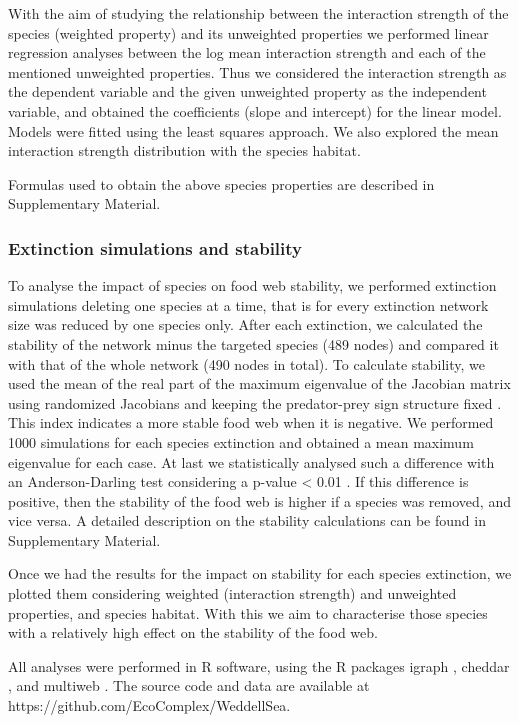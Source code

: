 \documentclass[gc, manuscript]{copernicus}
\begin{document}
With the aim of studying the relationship between the interaction
strength of the species (weighted property) and its unweighted
properties we performed linear regression analyses between the log mean
interaction strength and each of the mentioned unweighted properties.
Thus we considered the interaction strength as the dependent variable
and the given unweighted property as the independent variable, and
obtained the coefficients (slope and intercept) for the linear model.
Models were fitted using the least squares approach. We also explored
the mean interaction strength distribution with the species habitat.

Formulas used to obtain the above species properties are described in
Supplementary Material.

\subsubsection{Extinction simulations and stability}

To analyse the impact of species on food web stability, we performed
extinction simulations deleting one species at a time, that is for every
extinction network size was reduced by one species only. After each
extinction, we calculated the stability of the network minus the
targeted species (489 nodes) and compared it with that of the whole
network (490 nodes in total). To calculate stability, we used the mean
of the real part of the maximum eigenvalue of the Jacobian matrix using
randomized Jacobians and keeping the predator-prey sign structure fixed
\citep{Allesina2008, Grilli2016}. This index indicates a more stable
food web when it is negative. We performed 1000 simulations for each
species extinction and obtained a mean maximum eigenvalue for each case.
At last we statistically analysed such a difference with an
Anderson-Darling test considering a p-value \textless{} 0.01
\citep{Scholz1987}. If this difference is positive, then the stability
of the food web is higher if a species was removed, and vice versa. A
detailed description on the stability calculations can be found in
Supplementary Material.

Once we had the results for the impact on stability for each species
extinction, we plotted them considering weighted (interaction strength)
and unweighted properties, and species habitat. With this we aim to
characterise those species with a relatively high effect on the
stability of the food web.

All analyses were performed in R software, using the R packages igraph
\citep{Csardi2005}, cheddar \citep{Hudson2013}, and multiweb
\citep{Saravia2019}. The source code and data are available at
https://github.com/EcoComplex/WeddellSea.
\end{document}
